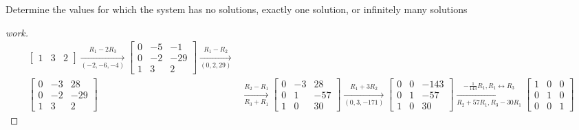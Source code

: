 \begin{question}{1.2}{Determine the values for which the system has no solutions, exactly one solution, or infinitely many solutions}
\begin{proof}[work]
\begin{align*}
\begin{bmatrix}
        1 & 3  & 2
      \end{bmatrix} \xrightarrow[(-2,-6,-4)]{R_1 - 2R_3}
      \begin{bmatrix}
        0 & -5 & -1  \\
        0 & -2 & -29 \\
        1 & 3  & 2
      \end{bmatrix} \xrightarrow[(0,2,29)]{R_1 - R_2}     \\
      \begin{bmatrix}
        0 & -3 & 28  \\
        0 & -2 & -29 \\
        1 & 3  & 2
      \end{bmatrix} & \xrightarrow[R_3 + R_1]{R_2 - R_1}
      \begin{bmatrix}
        0 & -3 & 28  \\
        0 & 1  & -57 \\
        1 & 0  & 30
      \end{bmatrix} \xrightarrow[(0,3,-171)]{R_1 + 3R_2}
      \begin{bmatrix}
        0 & 0 & -143 \\
        0 & 1 & -57  \\
        1 & 0 & 30
      \end{bmatrix} \xrightarrow[R_2+57R_1,R_3-30R_1]{-\frac{1}{143}R_1, R_1 \leftrightarrow R_3}
      \begin{bmatrix}
        1 & 0 & 0 \\
        0 & 1 & 0 \\
        0 & 0 & 1
      \end{bmatrix}
    \end{align*}
  \end{proof}
\end{question}

